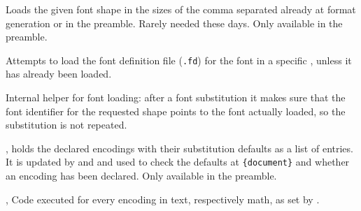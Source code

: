 \documentclass{l3in2edoc}
\begin{document}
\begin{function}[user]
  {
    \DeclarePreloadSizes
  }
  \begin{syntax}
         
  \end{syntax}
  Loads the given font shape in the sizes of the comma separated
   already at format generation or in the preamble.
  Rarely needed these days. Only available in the preamble.
\end{function}




\begin{function}[user]
  {
    \LoadFontDefinitionFile
  }
  \begin{syntax}
      
  \end{syntax}
  Attempts to load the font definition file (\texttt{.fd}) for the font
   in a specific , unless it has already
  been loaded.
\end{function}



\begin{function}[]
  {
    \do@subst@correction
  }
  Internal helper for font loading: after a font substitution it
  makes sure that the font identifier for the requested shape points
  to the font actually loaded, so the substitution is not repeated.
\end{function}



\begin{function}[]
  {
    \cdp@list,
    \cdp@elt
  }
   holds the declared encodings with their substitution
  defaults as a list of
  entries. It is updated by  and
   and used to check the defaults at
  \texttt{\{document\}} and whether an encoding has been
  declared. Only available in the preamble.
\end{function}



\begin{function}[]
  {
    ,
  }
  Code executed for every encoding in text, respectively math,
  as set by .
\end{function}
\end{document}
